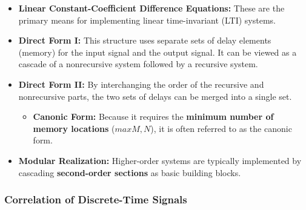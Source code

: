 \begin{itemize}
\tightlist
\item
  \textbf{Linear Constant-Coefficient Difference Equations:} These are
  the primary means for implementing linear time-invariant (LTI)
  systems.
\item
  \textbf{Direct Form I:} This structure uses separate sets of delay
  elements (memory) for the input signal and the output signal. It can
  be viewed as a cascade of a nonrecursive system followed by a
  recursive system.
\item
  \textbf{Direct Form II:} By interchanging the order of the recursive
  and nonrecursive parts, the two sets of delays can be merged into a
  single set.

  \begin{itemize}
  \tightlist
  \item
    \textbf{Canonic Form:} Because it requires the \textbf{minimum
    number of memory locations} (\(max{M, N}\)), it is often referred to
    as the canonic form.
  \end{itemize}
\item
  \textbf{Modular Realization:} Higher-order systems are typically
  implemented by cascading \textbf{second-order sections} as basic
  building blocks.
\end{itemize}

\subsubsection{Correlation of Discrete-Time
Signals}\label{correlation-of-discrete-time-signals}

